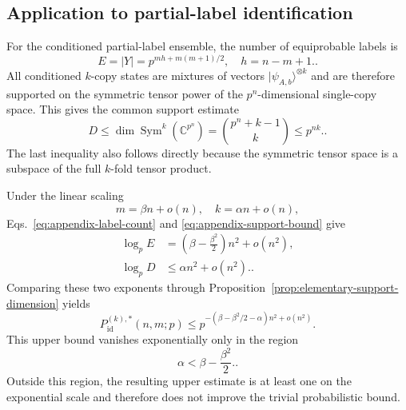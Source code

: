 \documentclass[11pt]{article}
\newcommand{\1}{\mathbf 1}
\theoremstyle{plain}
\theoremstyle{definition}
\theoremstyle{remark}
\begin{document}
\subsection{Application to partial-label identification}
For the conditioned partial-label ensemble, the number of equiprobable labels
is
\begin{equation}
 E=\lvert Y\rvert=p^{mh+m(m+1)/2},\quad h=n-m+1.                  \label{eq:appendix-label-count}.
\end{equation}
All conditioned $k$-copy states are mixtures of vectors
$|\psi_{A,b}\rangle^{\otimes k}$ and are therefore supported on the symmetric
tensor power of the $p^n$-dimensional single-copy space.  This gives the common
support estimate
\begin{equation}
 D\le \dim\operatorname{Sym}^k(\mathbb C^{p^n})
 =\binom{p^n+k-1}{k}
 \le p^{nk}.                                             \label{eq:appendix-support-bound}.
\end{equation}
The last inequality also follows directly because the symmetric tensor space
is a subspace of the full $k$-fold tensor product.

Under the linear scaling
\[
 m=\beta n+o(n),\quad k=\alpha n+o(n),
\]
Eqs.~\eqref{eq:appendix-label-count} and
\eqref{eq:appendix-support-bound} give
\begin{align}
 \log_p E
 &=\left(\beta-\frac{\beta^2}{2}\right)n^2+o(n^2),       \label{eq:appendix-label-rate}\\
 \log_p D
 &\le \alpha n^2+o(n^2).                                \label{eq:appendix-support-rate}.
\end{align}
Comparing these two exponents through
Proposition~\ref{prop:elementary-support-dimension} yields
\begin{equation}
 P_{\mathrm{id}}^{(k),*}(n,m;p)
 \le
 p^{-\left(\beta-\beta^2/2-\alpha\right)n^2+o(n^2)}     \label{eq:appendix-elementary-rate}.
\end{equation}
This upper bound vanishes exponentially only in the region
\begin{equation}
 \alpha<\beta-\frac{\beta^2}{2}.                         \label{eq:appendix-elementary-region}.
\end{equation}
Outside this region, the resulting upper estimate is at least one on the
exponential scale and therefore does not improve the trivial probabilistic
bound.
\end{document}
